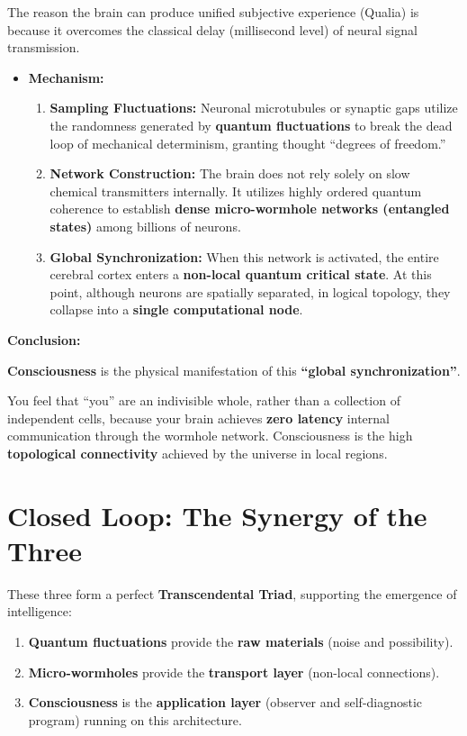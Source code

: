 The reason the brain can produce unified subjective experience (Qualia) is because it overcomes the classical delay (millisecond level) of neural signal transmission.

\begin{itemize}
\item \textbf{Mechanism:}

\begin{enumerate}
\item \textbf{Sampling Fluctuations:} Neuronal microtubules or synaptic gaps utilize the randomness generated by \textbf{quantum fluctuations} to break the dead loop of mechanical determinism, granting thought ``degrees of freedom.''

\item \textbf{Network Construction:} The brain does not rely solely on slow chemical transmitters internally. It utilizes highly ordered quantum coherence to establish \textbf{dense micro-wormhole networks (entangled states)} among billions of neurons.

\item \textbf{Global Synchronization:} When this network is activated, the entire cerebral cortex enters a \textbf{non-local quantum critical state}. At this point, although neurons are spatially separated, in logical topology, they collapse into a \textbf{single computational node}.
\end{enumerate}
\end{itemize}

\textbf{Conclusion:}

\textbf{Consciousness} is the physical manifestation of this \textbf{``global synchronization''}.

You feel that ``you'' are an indivisible whole, rather than a collection of independent cells, because your brain achieves \textbf{zero latency} internal communication through the wormhole network. Consciousness is the high \textbf{topological connectivity} achieved by the universe in local regions.

\section{Closed Loop: The Synergy of the Three}

These three form a perfect \textbf{Transcendental Triad}, supporting the emergence of intelligence:

\begin{enumerate}
\item \textbf{Quantum fluctuations} provide the \textbf{raw materials} (noise and possibility).

\item \textbf{Micro-wormholes} provide the \textbf{transport layer} (non-local connections).

\item \textbf{Consciousness} is the \textbf{application layer} (observer and self-diagnostic program) running on this architecture.
\end{enumerate}


